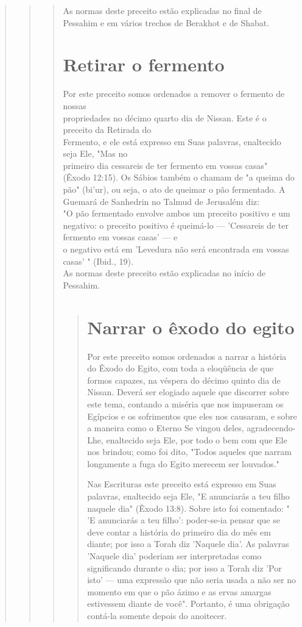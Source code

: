 \begin{quote}
\begin{quote}
\begin{quote}
As normas deste preceito estão explicadas no final de Pessahim e em
vários trechos de Berakhot e de Shabat.

\section{Retirar o fermento}

Por este preceito somos ordenados a remover o fermento de nossas\\
propriedades no décimo quarto dia de Nissan. Este é o preceito da
Retirada do\\
Fermento, e ele está expresso em Suas palavras, enaltecido seja Ele,
"Mas no\\
primeiro dia cessareis de ter fermento em vossas casas" (Êxodo 12:15).
Os Sábios
também o chamam de "a queima do pão" (bi'ur), ou seja, o ato de
queimar
o pão fermentado. A Guemará de Sanhedrin no Talmud de Jerusalém
diz:\\
"O pão fermentado envolve ambos um preceito positivo e um negativo: o
preceito
positivo é queimá-lo --- 'Cessareis de ter fermento em vossas
casas' --- e\\
o negativo está em 'Levedura não será encontrada em vossas casas' "
(Ibid., 19).\\
As normas deste preceito estão explicadas no início de Pessahim.

\begin{quote}
\section{Narrar o êxodo do egito}

Por este preceito somos ordenados a narrar a história do Êxodo do Egito,
com toda a eloqüência de que formos capazes, na véspera do décimo quinto
dia de Nissan. Deverá ser elogiado aquele que discorrer sobre este tema,
contan­do a miséria que nos impuseram os Egípcios e os sofrimentos que
eles nos cau­saram, e sobre a maneira como o Eterno Se vingou deles,
agradecendo-Lhe, enal­tecido seja Ele, por todo o bem com que Ele nos
brindou; como foi dito, "To­dos aqueles que narram longamente a fuga do
Egito merecem ser louvados."

Nas Escrituras este preceito está expresso em Suas palavras, enalteci­do
seja Ele, "E anunciarás a teu filho naquele dia" (Êxodo 13:8). Sobre
isto foi comentado: " 'E anunciarás a teu filho': poder-se-ia pensar que
se deve contar a história do primeiro dia do mês em diante; por isso a
Torah diz 'Naquele dia'. As palavras 'Naquele dia' poderiam ser
interpretadas como significando duran­te o dia; por isso a Torah diz
'Por isto' --- uma expressão que não seria usada a não ser no momento em
que o pão ázimo e as ervas amargas estivessem dian­te de você".
Portanto, é uma obrigação contá-la somente depois do anoitecer.


\end{quote}
\end{quote}
\end{quote}
\end{quote}

